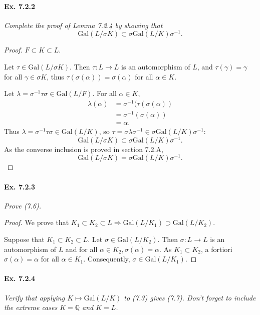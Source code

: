 \documentclass[11pt,a4paper]{article}
\newcommand{\Q}{\mathbb{Q}}
\newcommand{\Gal}{\mathrm{Gal}}
\begin{document}
\paragraph{Ex. 7.2.2}

{\it Complete the proof of Lemma 7.2.4 by showing that
$$\Gal(L/\sigma K) \subset \sigma \Gal(L/K) \sigma^{-1}.$$
}

\begin{proof}
$F \subset K \subset L$.

Let $\tau \in \Gal(L/\sigma K)$. Then $\tau : L \to L$ is an automorphism of $L$, and  $\tau(\gamma) = \gamma$ for all $\gamma \in \sigma K$, thus $\tau(\sigma(\alpha)) = \sigma(\alpha)$ for all $\alpha \in K$.

Let $\lambda = \sigma^{-1} \tau \sigma \in \Gal(L/F)$. For all $\alpha \in K$,
\begin{align*}
\lambda(\alpha) &= \sigma^{-1} (\tau(\sigma(\alpha))\\
&= \sigma^{-1}(\sigma(\alpha))\\
&=\alpha.
\end{align*}
Thus $\lambda = \sigma^{-1} \tau \sigma \in \Gal(L/K)$, so $\tau = \sigma \lambda \sigma^{-1} \in \sigma \Gal(L/K) \sigma^{-1}$:
$$\Gal(L/\sigma K) \subset \sigma \Gal(L/K) \sigma^{-1}.$$
As the converse inclusion is proved in section 7.2.A,
$$\Gal(L/\sigma K) = \sigma \Gal(L/K) \sigma^{-1}.$$
\end{proof}

\paragraph{Ex. 7.2.3}

{\it Prove (7.6).
}

\begin{proof}
We prove that $K_1 \subset K_2 \subset L \Rightarrow \Gal(L/K_1) \supset \Gal(L/K_2)$.

Suppose that $K_1 \subset K_2 \subset L$. Let $\sigma \in \Gal(L/K_2)$. Then  $\sigma : L \to L$ is an automorphism of $L$ and for all $\alpha \in K_2, \sigma(\alpha) = \alpha$. As $K_1 \subset K_2$, a fortiori $\sigma(\alpha) = \alpha$ for all $\alpha \in K_1$. Consequently, $\sigma \in \Gal(L/K_1)$.
\end{proof}

\paragraph{Ex. 7.2.4}

{\it Verify that applying $K \mapsto \Gal(L/K)$ to (7.3) gives (7.7). Don't forget to include the extreme cases $K = \Q$ and $K = L$.
}
\bigskip
\end{document}
